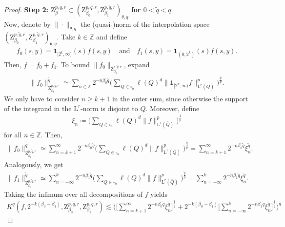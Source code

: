 \documentclass[11pt, leqno,parskip=half]{amsart}
\theoremstyle{definition}
\newcommand{\IZ}{\mathbb{Z}}
\renewcommand{\L}{\mathrm{L}}
\newcommand{\Z}{\mathrm{Z}}
\numberwithin{equation}{section}
\begin{document}
\begin{proof}
    \noindent \textbf{Step 2: $\Z^{p, q,r}_{\beta}\subset (\Z^{p,\tilde q,r}_{\beta_0} , \Z^{p,\tilde q,r}_{\beta_1} )_{\theta, q} $ for $0<\tilde q<q$}.\\
    Now, denote by $ \|\cdot \|_{\theta,q}$ the (quasi-)norm of the interpolation space $(\Z^{p,\tilde q,r}_{\beta_0} , \Z^{p,\tilde q,r}_{\beta_1} )_{\theta, q}$. Take $k\in \IZ$ and define
    \begin{align*}
        f_0(s,y) = \mathbf{1}_{[2^{k},\infty)}(s) f(s,y)  \quad \text{and} \quad f_1(s,y) =\mathbf{1}_{(0,2^{k})}(s) f(s,y).
    \end{align*}
    Then, $f = f_0 + f_1$. To bound $\|f_0\|_{\Z^{p,\tilde q,r}_{\beta_0}}$, expand
    \begin{align*}
        \|f_0\|^{\tilde q}_{\Z^{p,\tilde q,r}_{\beta_0}} \simeq \sum\limits_{n\in\IZ} 2^{-n\beta_0  \tilde q} \Big(\sum\limits_{Q\in\square_n} \ell(Q)^d \big\|\mathbf{1}_{[2^{k},\infty)} f \big\|_{\L^r(\bar Q)}^p \Big)^\frac{\tilde q}{p} .
    \end{align*}
    We only have to consider $n\geq k+1$ in the outer sum, since otherwise the support of the integrand in the $\L^r$-norm is disjoint to $\bar Q$. Moreover, define
    \begin{align}
        \label{eq: xin}
        \xi_n \coloneqq \Big(\sum\limits_{Q\in\square_n} \ell(Q)^d \|f \|_{\L^r(\bar Q)}^p \Big)^\frac{1}{p}
    \end{align}
    for all $n\in\IZ$. Then,
    \begin{align*}
        \|f_0\|^{\tilde q}_{\Z^{p,\tilde q,r}_{\beta_0}} \simeq \sum\limits_{n = k+1}^\infty 2^{-n\beta_0  \tilde q} \Big(\sum\limits_{Q\in\square_n} \ell(Q)^d \|f \|_{\L^r(\bar Q)}^p \Big)^\frac{\tilde q}{p} = \sum\limits_{n = k+1}^\infty 2^{-n\beta_0 \tilde q} \xi_n^{\tilde q}.
    \end{align*}
    Analogously, we get
    \begin{align*}
        \|f_1\|^{\tilde q}_{\Z^{p,\tilde q,r}_{\beta_1}} \simeq \sum\limits_{n = -\infty}^k 2^{-n\beta_1 \tilde q} \Big(\sum\limits_{Q\in\square_n} \ell(Q)^d \|f \|_{\L^r(\bar Q)}^p \Big)^\frac{\tilde q}{p} = \sum\limits_{n = -\infty}^k 2^{-n\beta_1 \tilde q} \xi_n^{\tilde q}.
    \end{align*}
    Taking the infimum over all decompositions of $f$ yields
    \begin{align*}
        K^q(f,2^{-k(\beta_0-\beta_1)},\Z^{p,\tilde q,r}_{\beta_0} , \Z^{p,\tilde q,r}_{\beta_1}) \lesssim \bigg(\Big[\sum\limits_{n = k+1}^\infty 2^{-n\beta_0  \tilde q} \xi_n^{\tilde q} \Big]^\frac{1}{\tilde q} + 2^{-k(\beta_0-\beta_1)}\Big[\sum\limits_{n = -\infty}^k 2^{-n\beta_1\tilde q} \xi_n^{\tilde q} \Big]^\frac{1}{\tilde q}\bigg)^q

\end{align*}
\end{proof}
\end{document}
